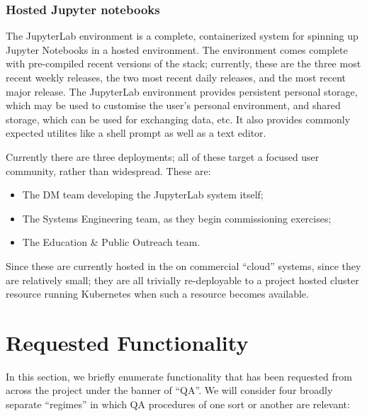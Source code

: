 \documentclass[DM,authoryear,toc,lsstdraft]{lsstdoc}
\begin{document}
\subsubsection{Hosted Jupyter notebooks}
\label{sec:current:square:jl}

The JupyterLab environment is a complete, containerized system for spinning up
Jupyter Notebooks in a hosted environment. The environment comes complete with
pre-compiled recent versions of the stack; currently, these are the three most
recent weekly releases, the two most recent daily releases, and the most
recent major release. The JupyterLab environment provides persistent personal
storage, which may be used to customise the user's personal environment, and
shared storage, which can be used for exchanging data, etc.  It also provides
commonly expected utilites like a shell prompt as well as a text editor.

Currently there are three deployments; all of these target a focused user
community, rather than widespread. These are:

\begin{itemize}

  \item{The DM team developing the JupyterLab system itself;}
  \item{The Systems Engineering team, as they begin commissioning exercises;}
  \item{The Education \& Public Outreach team.}

\end{itemize}

Since these are currently hosted in the on commercial ``cloud'' systems, since
they are relatively small; they are all trivially re-deployable to a project
hosted cluster resource running Kubernetes when such a resource becomes
available.

\section{Requested Functionality}
\label{sec:use}

In this section, we briefly enumerate functionality that has been requested
from across the project under the banner of ``QA''.  We will consider four
broadly separate ``regimes'' in which QA procedures of one sort or another are
relevant:
\end{document}
